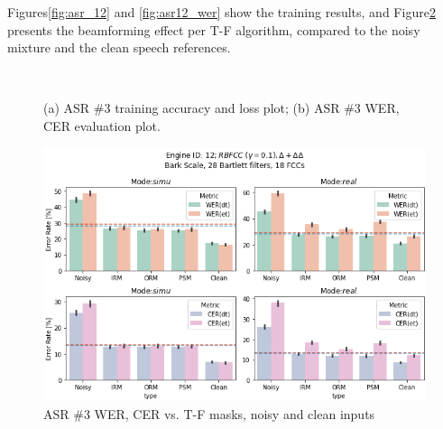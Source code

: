 Figures\;\ref{fig:asr_12} and \;\ref{fig:asr12_wer} show
the training results, and Figure\;\ref{fig:asr12_wer_masks}
presents the beamforming effect per T-F algorithm, compared to 
the noisy mixture and the clean speech references.
\begin{figure}[H]
    \centering
    \\
    \vspace{-0.3cm}
    \caption{(a) ASR \#3 training accuracy and loss plot;\;\;
        (b) ASR \#3 WER, CER evaluation plot.}\label{fig:asr12_wer_subplot} 
\end{figure}

\begin{figure}[H]
    \centering
    \includegraphics[width=0.95\linewidth]{ASR/images/asr12_wer_masks.png}
    \caption{ASR \#3 WER, CER vs. T-F masks, noisy and clean inputs }\label{fig:asr12_wer_masks}
\end{figure}


